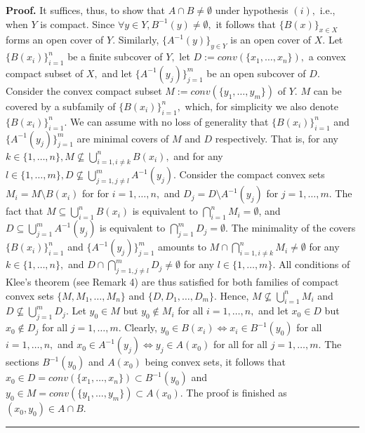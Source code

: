 \documentclass{article}
\newenvironment{proof}[1][Proof]{\noindent\textbf{#1.} }{\ \rule{0.5em}{0.5em}}
\begin{document}
\begin{proof}
It suffices, thus, to show that $A\cap B\neq \emptyset $ under hypothesis $%
(i),$ i.e., when $Y$ is compact. Since $\forall y\in Y,B^{-1}(y)\neq
\emptyset ,$ it follows that $\{B(x)\}_{x\in X}$ forms an open cover of $Y.$
Similarly, $\{A^{-1}(y)\}_{y\in Y}$ is an open cover of $X.$ Let $%
\{B(x_{i})\}_{i=1}^{n}$ be a finite subcover of $Y,$ let $%
D:=conv(\{x_{1},\ldots ,x_{n}\}),$ a convex compact subset of $X,$ and let $%
\{A^{-1}(y_{j})\}_{j=1}^{m}$ be an open subcover of $D.$ Consider the convex
compact subset $M:=conv(\{y_{1},\ldots ,y_{m}\})$ of $Y.$ $M$ can be covered
by a subfamily of $\{B(x_{i})\}_{i=1}^{n},$ which, for simplicity we also
denote $\{B(x_{i})\}_{i=1}^{n}.$ We can assume with no loss of generality
that $\{B(x_{i})\}_{i=1}^{n}$ and $\{A^{-1}(y_{j})\}_{j=1}^{m}$ are minimal
covers of $M$ and $D$ respectively. That is, for any $k\in \{1,\ldots
,n\},M\nsubseteq \bigcup\nolimits_{i=1,i\neq k}^{n}B(x_{i}),$ and for any $%
l\in \{1,\ldots ,m\},D\nsubseteq \bigcup\nolimits_{j=1,j\neq
l}^{m}A^{-1}(y_{j}).$ Consider the compact convex sets $M_{i}=M\setminus
B(x_{i})$ for for $i=1,\ldots ,n,$ and $D_{j}=D\setminus A^{-1}(y_{j})$ for $%
j=1,\ldots ,m.$ The fact that $M\subseteq \bigcup\nolimits_{i=1}^{n}B(x_{i})$
is equivalent to $\bigcap\nolimits_{i=1}^{n}M_{i}=\emptyset $, and $%
D\subseteq \bigcup\nolimits_{j=1}^{m}A^{-1}(y_{j})$ is equivalent to $%
\bigcap\nolimits_{j=1}^{m}D_{j}=\emptyset .$ The minimality of the covers $%
\{B(x_{i})\}_{i=1}^{n}$ and $\{A^{-1}(y_{j})\}_{j=1}^{m}$ amounts to $M\cap
\bigcap\nolimits_{i=1,i\neq k}^{n}M_{i}\neq \emptyset $ for any $k\in
\{1,\ldots ,n\},$ and $D\cap \bigcap\nolimits_{j=1,j\neq l}^{m}D_{j}\neq
\emptyset $ for any $l\in \{1,\ldots ,m\}.$ All conditions of Klee's theorem
(see Remark 4) are thus satisfied for both families of compact convex sets $%
\{M,M_{1},\ldots ,M_{n}\}$ and $\{D,D_{1},\ldots ,D_{m}\}.$ Hence, $%
M\nsubseteq \bigcup\nolimits_{i=1}^{n}M_{i}$ and $D\nsubseteq
\bigcup\nolimits_{j=1}^{m}D_{j}.$ Let \thinspace $y_{0}\in M$ but $%
y_{0}\notin M_{i}$ for all $i=1,\ldots ,n,$ and let $x_{0}\in D$ but $%
x_{0}\notin D_{j}$ for all $j=1,\ldots ,m.$ Clearly, $y_{0}\in
B(x_{i})\Longleftrightarrow x_{i}\in B^{-1}(y_{0})$ for all $i=1,\ldots ,n,$
and $x_{0}\in A^{-1}(y_{j})\Longleftrightarrow y_{j}\in A(x_{0})$ for all
for all $j=1,\ldots ,m.$ The sections $B^{-1}(y_{0})$ and $A(x_{0})$ being
convex sets, it follows that $x_{0}\in D=conv(\{x_{1},\ldots
,x_{n}\})\subset B^{-1}(y_{0})$ and $y_{0}\in M=conv(\{y_{1},\ldots
,y_{m}\})\subset A(x_{0}).$ The proof is finished as $(x_{0},y_{0})\in A\cap
B.$
\end{proof}
\end{document}
